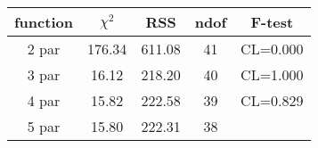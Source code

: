 \begin{tabular}{c|c|c|c|c}
function & $\chi^2$ & RSS & ndof & F-test \\
\hline
2 par & 176.34 & 611.08 & 41 & CL=0.000 \\
3 par & 16.12 & 218.20 & 40 & CL=1.000 \\
4 par & 15.82 & 222.58 & 39 & CL=0.829 \\
5 par & 15.80 & 222.31 & 38 & \\
\hline
\end{tabular}